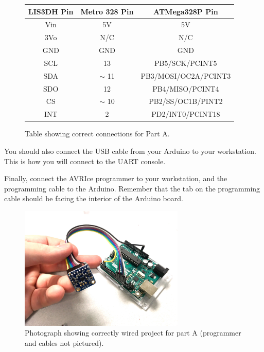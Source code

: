 \documentclass{article}
\begin{document}
\begin{figure}[H]

	\centering

	\begin{tabular}{|c|c|c|}

		\hline
		LIS3DH Pin & Metro 328 Pin & ATMega328P Pin \\
		\hline\hline

		Vin & 5V & 5V \\ \hline
		3Vo & N/C & N/C \\ \hline
		GND & GND & GND \\ \hline
		SCL & 13 & PB5/SCK/PCINT5 \\ \hline
		SDA & $\sim$ 11 & PB3/MOSI/OC2A/PCINT3 \\ \hline
		SDO & 12 & PB4/MISO/PCINT4 \\ \hline
		CS & $\sim$ 10 & PB2/SS/OC1B/PINT2 \\ \hline
		INT & 2 & PD2/INT0/PCINT18 \\ \hline

	\end{tabular}

	\caption{Table showing correct connections for Part A.}

\end{figure}


You should also connect the USB cable from your Arduino to your workstation.
This is how you will connect to the UART console.

Finally, connect the AVRIce programmer to your workstation, and the programming
cable to the Arduino. Remember that the tab on the programming cable should be
facing the interior of the Arduino board.

\begin{figure}[H]
	\centering

	\includegraphics[max width = 0.7\textwidth]{wiring_part_a.jpg}

	\caption{Photograph showing correctly wired project for part A
	(programmer and cables not pictured).}

\end{figure}
\end{document}

